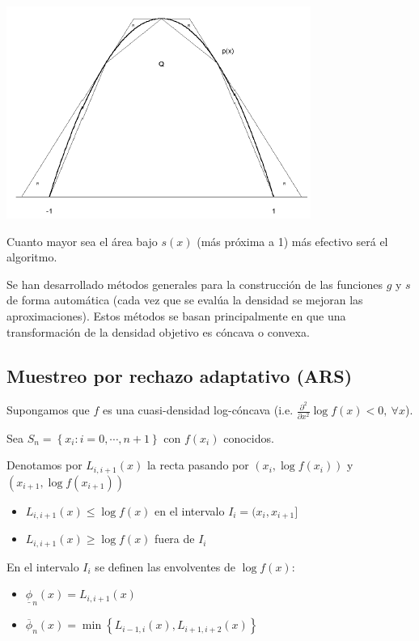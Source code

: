 \documentclass[]{book}
\theoremstyle{definition}
\theoremstyle{definition}
\theoremstyle{definition}
\theoremstyle{remark}
\begin{document}
\begin{center}\includegraphics[width=0.7\linewidth]{images/squeeze} \end{center}

Cuanto mayor sea el área bajo \(s\left( x\right)\) (más próxima a 1) más
efectivo será el algoritmo.

Se han desarrollado métodos generales para la construcción de las
funciones \(g\) y \(s\) de forma automática (cada vez que se evalúa la
densidad se mejoran las aproximaciones). Estos métodos se basan
principalmente en que una transformación de la densidad objetivo es
cóncava o convexa.

\subsection{Muestreo por rechazo adaptativo
(ARS)}\label{muestreo-por-rechazo-adaptativo-ars}

Supongamos que \(f\) es una cuasi-densidad log-cóncava (i.e.
\(\frac{\partial ^{2}}{\partial x^{2}}\log f\left( x\right) <0, ~\forall x\)).

Sea \(S_n=\left\{ x_{i}:i=0,\cdots ,n+1\right\}\) con \(f(x_{i})\)
conocidos.

Denotamos por \(L_{i,i+1}(x)\) la recta pasando por
\(\left( x_{i},\log f(x_{i})\right)\) y
\(\left( x_{i+1},\log f(x_{i+1})\right)\)

\begin{itemize}
\item
  \(L_{i,i+1}(x)\leq \log f\left( x\right)\) en el intervalo
  \(I_{i}=(x_{i},x_{i+1}]\)
\item
  \(L_{i,i+1}(x)\geq \log f\left( x\right)\) fuera de \(I_{i}\)
\end{itemize}

En el intervalo \(I_{i}\) se definen las envolventes de
\(\log f\left( x\right)\):

\begin{itemize}
\item
  \(\underline{\phi}_n(x)=L_{i,i+1}(x)\)
\item
  \(\overline{\phi}_n(x)=\min \left\{L_{i-1,i}(x),L_{i+1,i+2}(x)\right\}\)
\end{itemize}
\end{document}
